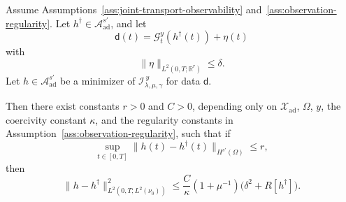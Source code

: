 \documentclass[10pt,a4paper]{amsart}
\newcommand{\obsdata}{\mathsf{d}}
\begin{document}
\begin{theorem}
    \label{thm:pathwise-stability}
    Assume Assumptions~\ref{ass:joint-transport-observability}
    and~\ref{ass:observation-regularity}. Let
    \(h^\dagger\in \mathcal A_{\mathrm{ad}}^{s'}\), and let
    \[
        \obsdata(t)=\mathcal G_t^y(h^\dagger(t))+\eta(t)
    \]
    with
    \[
        \|\eta\|_{L^2(0,T;\mathbb R^r)}\le\delta.
    \]
    Let \(h\in\mathcal A_{\mathrm{ad}}^{s'}\) be a minimizer
    of \(\mathcal I_{\lambda,\mu,\gamma}^{\,y}\) for data \(\obsdata\).

    Then there exist constants \(r>0\) and \(C>0\), depending only on
    \(\mathcal X_{\mathrm{ad}}\), \(\Omega\), \(y\), the coercivity constant \(\kappa\), and
    the regularity constants in Assumption~\ref{ass:observation-regularity}, such that if
    \begin{equation}
        \label{eq:proximity-condition}
        \sup_{t\in[0,T]}\|h(t)-h^\dagger(t)\|_{H^{s'}(\Omega)}\le r,
    \end{equation}
    then
    \begin{equation}
        \label{eq:pathwise-stability-estimate}
        \|h-h^\dagger\|_{L^2(0,T;L^2(\nu_0))}^2
        \le
        \frac{C}{\kappa}(1+\mu^{-1})
        \Big(
        \delta^2+R[h^\dagger]
        \Big).
    \end{equation}
\end{theorem}
\end{document}
